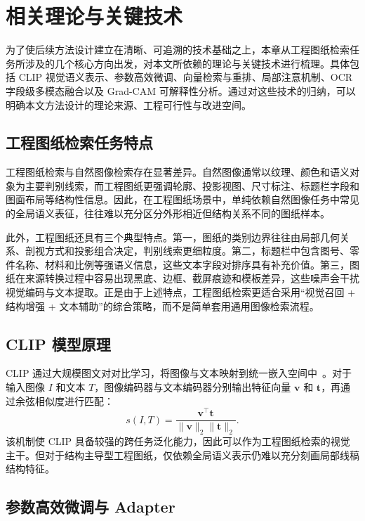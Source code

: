 \chapter{相关理论与关键技术}

为了使后续方法设计建立在清晰、可追溯的技术基础之上，本章从工程图纸检索任务所涉及的几个核心方向出发，对本文所依赖的理论与关键技术进行梳理。具体包括 CLIP 视觉语义表示、参数高效微调、向量检索与重排、局部注意机制、OCR 字段级多模态融合以及 Grad-CAM 可解释性分析。通过对这些技术的归纳，可以明确本文方法设计的理论来源、工程可行性与改进空间。

\section{工程图纸检索任务特点}

工程图纸检索与自然图像检索存在显著差异。自然图像通常以纹理、颜色和语义对象为主要判别线索，而工程图纸更强调轮廓、投影视图、尺寸标注、标题栏字段和图面布局等结构性信息。因此，在工程图纸场景中，单纯依赖自然图像任务中常见的全局语义表征，往往难以充分区分外形相近但结构关系不同的图纸样本。

此外，工程图纸还具有三个典型特点。第一，图纸的类别边界往往由局部几何关系、剖视方式和投影组合决定，判别线索更细粒度。第二，标题栏中包含图号、零件名称、材料和比例等强语义信息，这些文本字段对排序具有补充价值。第三，图纸在来源转换过程中容易出现黑底、边框、截屏痕迹和模板差异，这些噪声会干扰视觉编码与文本提取。正是由于上述特点，工程图纸检索更适合采用“视觉召回 + 结构增强 + 文本辅助”的综合策略，而不是简单套用通用图像检索流程。

\section{CLIP 模型原理}

CLIP 通过大规模图文对对比学习，将图像与文本映射到统一嵌入空间中~\citep{radford2021clip}。对于输入图像 $I$ 和文本 $T$，图像编码器与文本编码器分别输出特征向量 $\bm{v}$ 和 $\bm{t}$，再通过余弦相似度进行匹配：
\begin{equation}
  s(I,T)=\frac{\bm{v}^{\top}\bm{t}}{\|\bm{v}\|_2\|\bm{t}\|_2}.
\end{equation}
该机制使 CLIP 具备较强的跨任务泛化能力，因此可以作为工程图纸检索的视觉主干。但对于结构主导型工程图纸，仅依赖全局语义表示仍难以充分刻画局部线稿结构特征。

\section{参数高效微调与 Adapter}

